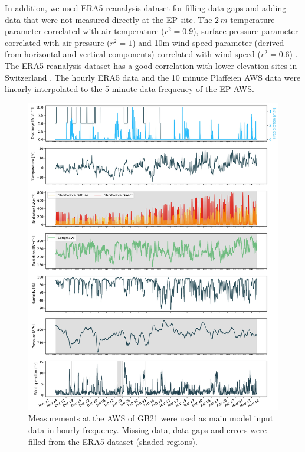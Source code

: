 \documentclass[utf8]{frontiersSCNS} %
\begin{document}
In addition, we used ERA5 reanalysis dataset \citep{era5} for filling data gaps and adding data that were not measured
directly at the EP site. The $2\,m$ temperature parameter correlated with air temperature ($r^2 =0.9 $), surface
pressure parameter correlated with air pressure ($r^2 = 1$) and 10m wind speed parameter (derived from horizontal and
vertical components) correlated with wind speed ($r^2 =0.6 $) . The ERA5 reanalysis dataset has a good correlation with
lower elevation sites in Switzerland \citep{Scherrer_2020}. The hourly ERA5 data and the 10 minute Plaffeien AWS data
were linearly interpolated to the 5 minute data frequency of the EP AWS. 
  
\begin{figure} \centering \includegraphics[width=\linewidth]{./Figures/Model_Input_Manual.jpg} 

\caption{Measurements at the AWS of GB21 were used as main model input data in hourly frequency. Missing data, data gaps
and errors were filled from the ERA5 dataset (shaded regions).} 

    \label{fig:input} \end{figure}
\end{document}
